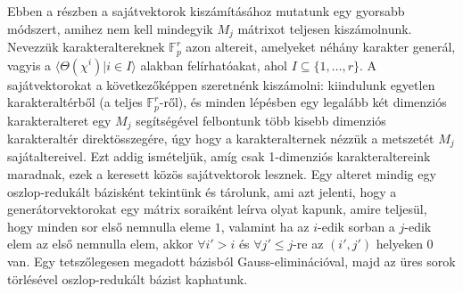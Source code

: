 Ebben a részben a sajátvektorok kiszámításához mutatunk egy gyorsabb módszert, amihez nem kell mindegyik $M_j$ mátrixot teljesen kiszámolnunk.
Nevezzük karakteraltereknek $\mathbb{F}_p^r$ azon altereit, amelyeket néhány karakter generál, vagyis a $\langle \Theta(\chi^i) | i \in I \rangle$ alakban felírhatóakat, ahol $I \subseteq \{1,\dots,r\}$.
A sajátvektorokat a következőképpen szeretnénk kiszámolni:
kiindulunk egyetlen karakteraltérből (a teljes $\mathbb{F}_p^r$-ről), és minden lépésben egy legalább két dimenziós karakteralteret egy $M_j$ segítségével felbontunk több kisebb dimenziós karakteraltér direktösszegére,
úgy hogy a karakteralternek nézzük a metszetét $M_j$ sajátaltereivel.
Ezt addig ismételjük, amíg csak 1-dimenziós karakteraltereink maradnak, ezek a keresett közös sajátvektorok lesznek.
Egy alteret mindig egy oszlop-redukált bázisként tekintünk és tárolunk, ami azt jelenti, hogy a generátorvektorokat egy mátrix soraiként leírva olyat kapunk,
amire teljesül, hogy minden sor első nemnulla eleme $1$, valamint ha az $i$-edik sorban a $j$-edik elem az első nemnulla elem, akkor $\forall i'>i$ és $\forall j'\le j$-re az $(i',j')$ helyeken 0 van.
Egy tetszőlegesen megadott bázisból Gauss-eliminációval, majd az üres sorok törlésével oszlop-redukált bázist kaphatunk.

